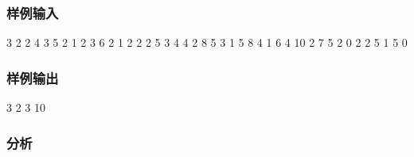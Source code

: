 \subsubsection{样例输入}
\begin{Code}
3
2 2 4 3 5
2 1 2 3 6
2 1 2 2 2
5
3 4 4 2 8 5 3
1 5 8
4 1 6 4 10 2 7 5 2
0
2 2 5 1 5
0
\end{Code}

\subsubsection{样例输出}
\begin{Code}
3 2
3 10
\end{Code}

\subsubsection{分析}

